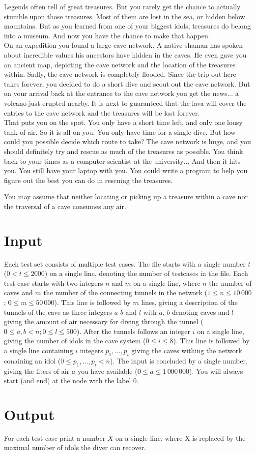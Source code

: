 Legends often tell of great treasures. But you rarely get the chance to
actually stumble upon those treasures. Most of them are lost in the sea, or
hidden below mountains. But as you learned from one of your biggest idols,
treasures do belong into a museum. And now you have the chance to make that
happen.\\

On an expedition you found a large cave network. A native shaman has spoken
about incredible values his ancestors have hidden in the caves.  He even gave
you an ancient map, depicting the cave network and the location of the
treasures within. Sadly, the cave network is completely flooded.  Since the trip out
here takes forever, you decided to do a short dive and scout out the cave
network. But on your arrival back at the entrance to the cave network you get the news$\ldots$ a
volcano just erupted nearby. It is next to guaranteed that the lava will cover
the entries to the cave network and the treasures will be lost forever.\\

That puts you on the spot. You only have a short time left, and only one lousy
tank of air.  So it is all on you. You only have time for a single dive. But
how could you possible decide which route to take?  The cave network is huge,
and you should definitely try and rescue as much of the treasures as possible.
You think back to your times as a computer scientist at the university$\ldots$
And then it hits you. You still have your laptop with you. You could write a program
to help you figure out the best you can do in rescuing the treasures.

You may assume that neither locating or picking up a treasure within a cave nor the traversal of a cave consumes any air.

\section*{Input}
Each test set consists of multiple test cases.
The file starts with a single number $t$ ($0 < t \le 2000$) on a single line, denoting the number of testcases in the file.
Each test case starts with two integers $n$ and $m$ on a single line, 
where $n$ the number of caves and $m$ the number of the connecting tunnels in the network
($1 \leq n \leq 10\,000$; $0 \leq m \leq 50\,000$).
This line is followed by $m$ lines, giving a description of the tunnels of the cave as three integers $a$ $b$ and $l$
with $a$, $b$ denoting caves and $l$ giving the amount of air necessary for diving through the tunnel
($0 \le a, b < n; 0 \le l \le 500$).
After the tunnels follows an integer $i$ 
on a single line, giving the number of idols in the cave system
($0 \leq i \leq 8$).
This line is followed by a single line containing $i$ integers $p_1, \ldots, p_i$ 
giving the caves withing the network conaining an idol
($0 \le p_1,\ldots,p_i < n$).
The input is concluded by a single number, giving the liters of air $a$ 
you have available
($0 \le a \le 1\,000\,000$).
You will always start (and end) at the node with the label $0$.

\section*{Output}
For each test case print a number $X$ on a single line, where X is replaced by the maximal number of idols the diver can recover.
